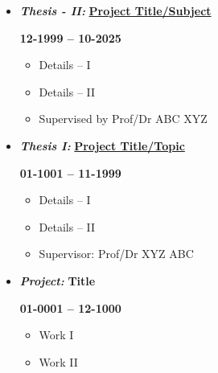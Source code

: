 \noindent\makebox[\linewidth]{\rule{\linewidth}{1.1pt}}
\vspace{-0.5cm}
\begin{itemize} \setlength\itemsep{-0.1em}
	\item \begin{multicols}{2}
		\begin{flushleft}
			\textbf{\textit{Thesis - II:}} \href{URL - I}{\textbf{Project Title/Subject}}
		\end{flushleft}
		\columnbreak
		\begin{flushright}
			\textbf{12-1999 -- 10-2025}
		\end{flushright}
	\end{multicols}
	\vspace{-0.45cm}
	\begin{itemize}
		\setlength\itemsep{-0.1em}
		\item Details -- I
		\item Details -- II
		\item Supervised by Prof/Dr ABC XYZ
	\end{itemize}
	\vspace{-0.25cm}
	\item \begin{multicols}{2}
		\begin{flushleft}
			\textbf{\textit{Thesis I:}} \href{URL - I}{\textbf{Project Title/Topic}}
		\end{flushleft}
		\columnbreak
		\begin{flushright}
			\textbf{01-1001 -- 11-1999} \\
		\end{flushright}
	\end{multicols}
	\vspace{-0.45cm}
	\begin{itemize}
		\setlength\itemsep{-0.1em}
		\item Details -- I
		\item Details -- II
		\item Supervisor: Prof/Dr XYZ ABC
	\end{itemize}
	
	\vspace{-0.25cm}
	\item \begin{multicols}{2}
		\begin{flushleft}
			\textit{\textbf{Project:}} {\textbf{Title}}
		\end{flushleft}
		\columnbreak
		\begin{flushright}
			\textbf{01-0001 -- 12-1000}
		\end{flushright}
	\end{multicols}
	\vspace{-0.45cm}
	\begin{itemize}
		\item Work I 
		\item  Work II
	\end{itemize}
	
\end{itemize}